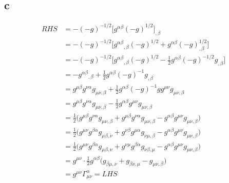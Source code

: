 \documentclass{article}
\begin{document}
\subsection*{c}
\begin{align*}
RHS &=-(-g)^{-1/2}\Big[g^{\alpha\beta}(-g)^{1/2}\Big]_{,\beta} \\
&= -(-g)^{-1/2}\Big[g^{\alpha\beta}{}_{,\beta}(-g)^{1/2} + g^{\alpha\beta}(-g)^{1/2}_{,\beta} \Big]\\
&= -(-g)^{-1/2}\Big[g^{\alpha\beta}{}_{,\beta}(-g)^{1/2} - \frac{1}{2}g^{\alpha\beta}(-g)^{-1/2}g_{,\beta} \Big]\\
&= - g^{\alpha\beta}{}_{,\beta} + \frac{1}{2}g^{\alpha\beta}(-g)^{-1}g_{,\beta}\\
&= g^{\mu\beta}g^{\nu\alpha}g_{\mu\nu,\beta} + \frac{1}{2}g^{\alpha\beta}(-g)^{-1}gg^{\mu\nu}g_{\mu\nu,\beta}\\
&= g^{\mu\beta}g^{\nu\alpha}g_{\mu\nu,\beta} - \frac{1}{2}g^{\alpha\beta}g^{\mu\nu}g_{\mu\nu,\beta}\\
&= \frac{1}{2}\Big(g^{\mu\beta}g^{\nu\alpha}g_{\mu\nu,\beta}  + g^{\mu\beta}g^{\nu\alpha}g_{\mu\nu,\beta} - g^{\alpha\beta}g^{\mu\nu}g_{\mu\nu,\beta} \Big) \\
&= \frac{1}{2}\Big(g^{\mu\nu}g^{\beta\alpha}g_{\mu\beta, \nu}  + g^{\nu\beta}g^{\mu\alpha}g_{\nu\mu,\beta} - g^{\alpha\beta}g^{\mu\nu}g_{\mu\nu,\beta} \Big) \\
&= \frac{1}{2}\Big(g^{\mu\nu}g^{\beta\alpha}g_{\mu\beta, \nu}  + g^{\nu\mu}g^{\beta\alpha}g_{\nu\beta,\mu} - g^{\alpha\beta}g^{\mu\nu}g_{\mu\nu,\beta} \Big) \\
&= g^{\mu\nu}\cdot \frac{1}{2}g^{\alpha\beta} \Big(g_{\beta\mu, \nu}  +g_{\beta\nu,\mu} - g_{\mu\nu,\beta} \Big)\\
&= g^{\mu\nu} \Gamma^\alpha_{\mu\nu} = LHS
\end{align*}
\end{document}
